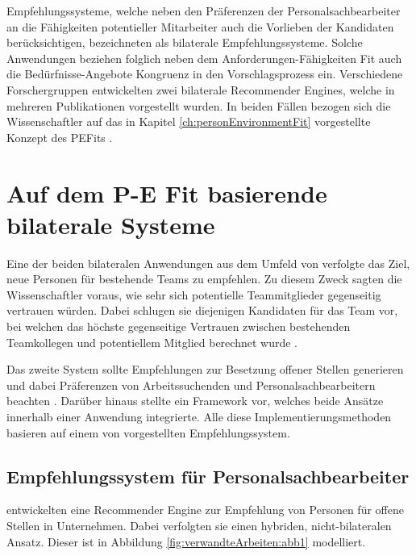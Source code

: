 Empfehlungssysteme, welche neben den Präferenzen der Personalsachbearbeiter an die Fähigkeiten potentieller Mitarbeiter auch die Vorlieben der Kandidaten berücksichtigen, bezeichneten \textcite[S. 4]{malinowski:2006} als bilaterale Empfehlungssysteme. Solche Anwendungen beziehen folglich neben dem Anforderungen-Fähigkeiten Fit auch die Bedürfnisse-Angebote Kongruenz in den Vorschlagsprozess ein. Verschiedene Forschergruppen entwickelten zwei bilaterale Recommender Engines, welche in mehreren Publikationen vorgestellt wurden. In beiden Fällen bezogen sich die Wissenschaftler auf das in Kapitel \ref{ch:personEnvironmentFit} vorgestellte Konzept des \acp{PEFit} \cite[S. 4f.]{keim:2007}\cite[S. 3f.]{keim:2005}\cite[S. 3f.]{malinowski:2005}\cite[S. 3f.]{malinowski:2006}\cite[S. 3ff.]{malinowski:2008}.

\section{Auf dem P-E Fit basierende bilaterale Systeme}
\label{ch:verwandteArbeiten:aufDemPEFitBasierendeBilateraleSysteme}
Eine der beiden bilateralen Anwendungen aus dem Umfeld von \textcite[S. 1ff.]{malinowski:2006} verfolgte das Ziel, neue Personen für bestehende Teams zu empfehlen. Zu diesem Zweck sagten die Wissenschaftler voraus, wie sehr sich potentielle Teammitglieder gegenseitig vertrauen würden. Dabei schlugen sie diejenigen Kandidaten für das Team vor, bei welchen das höchste gegenseitige Vertrauen zwischen bestehenden Teamkollegen und potentiellem Mitglied berechnet wurde \cite[S. 5ff.]{keim:2005}\cite[S. 1ff.]{malinowski:2005}.

Das zweite System sollte Empfehlungen zur Besetzung offener Stellen generieren und dabei Präferenzen von Arbeitssuchenden und Personalsachbearbeitern beachten \cite[S. 1ff.]{malinowski:2006}. Darüber hinaus stellte \textcite[S. 5ff.]{keim:2007} ein Framework vor, welches beide Ansätze innerhalb einer Anwendung integrierte. Alle diese Implementierungsmethoden basieren auf einem von \textcite[S. 6ff.]{faerber:2003} vorgestellten Empfehlungssystem.

\subsection{Empfehlungssystem für Personalsachbearbeiter}
\label{ch:verwandteArbeiten:aufDemPEFitBasierendeBilateraleSysteme:grundlegendesEmpfelungssystem}
\textcite[S. 4ff.]{faerber:2003} entwickelten eine Recommender Engine zur Empfehlung von Personen für offene Stellen in Unternehmen. Dabei verfolgten sie einen hybriden, nicht-bilateralen Ansatz. Dieser ist in Abbildung \ref{fig:verwandteArbeiten:abb1} modelliert.

